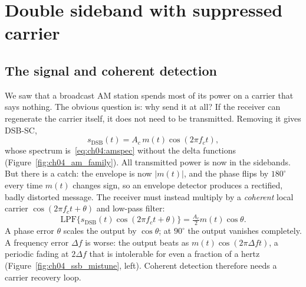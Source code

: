 
\section{Double sideband with suppressed carrier}
\label{sec:ch04:dsbsc}

\subsection{The signal and coherent detection}

We saw that a broadcast AM station spends most of its power on a carrier that says nothing. The obvious
question is: why send it at all? If the receiver can regenerate the carrier itself, it does not need to be
transmitted. Removing it gives DSB-SC,
\begin{equation}
s_{\text{DSB}}(t)=A_c\,m(t)\cos(2\pi f_c t),
\label{eq:ch04:dsb}
\end{equation}
whose spectrum is~\eqref{eq:ch04:amspec} without the delta functions (Figure~\ref{fig:ch04_am_family}).
All transmitted power is now in the sidebands. But there is a catch: the envelope is now $|m(t)|$, and
the phase flips by $180^\circ$ every time $m(t)$ changes sign, so an envelope detector produces a
rectified, badly distorted message. The receiver must instead multiply by a \emph{coherent} local
carrier $\cos(2\pi f_c t+\theta)$ and low-pass filter:
\begin{equation}
\text{LPF}\{s_{\text{DSB}}(t)\cos(2\pi f_c t+\theta)\}=\tfrac{A_c}{2}m(t)\cos\theta.
\label{eq:ch04:coh}
\end{equation}
A phase error $\theta$ scales the output by $\cos\theta$; at $90^\circ$ the output vanishes completely. A
frequency error $\Delta f$ is worse: the output beats as $m(t)\cos(2\pi\Delta f t)$, a periodic fading at
$2\Delta f$ that is intolerable for even a fraction of a hertz (Figure~\ref{fig:ch04_ssb_mistune}, left).
Coherent detection therefore needs a carrier recovery loop.



